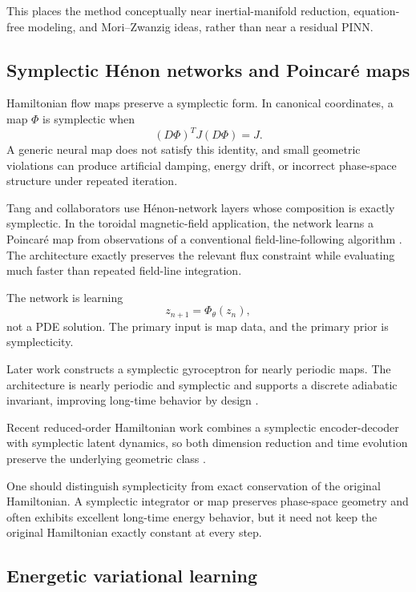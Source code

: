 \documentclass[11pt]{article}
\begin{document}
This places the method conceptually near inertial-manifold reduction, equation-free modeling, and Mori--Zwanzig ideas, rather than near a residual PINN.

\subsection{Symplectic H\'enon networks and Poincar\'e maps}

Hamiltonian flow maps preserve a symplectic form. In canonical coordinates, a map \(\Phi\) is symplectic when
\begin{equation}
 (D\Phi)^TJ(D\Phi)=J.
\end{equation}
A generic neural map does not satisfy this identity, and small geometric violations can produce artificial damping, energy drift, or incorrect phase-space structure under repeated iteration.

Tang and collaborators use H\'enon-network layers whose composition is exactly symplectic. In the toroidal magnetic-field application, the network learns a Poincar\'e map from observations of a conventional field-line-following algorithm \citep{burby2021poincare}. The architecture exactly preserves the relevant flux constraint while evaluating much faster than repeated field-line integration.

The network is learning
\[
 z_{n+1}=\Phi_\theta(z_n),
\]
not a PDE solution. The primary input is map data, and the primary prior is symplecticity.

Later work constructs a symplectic gyroceptron for nearly periodic maps. The architecture is nearly periodic and symplectic and supports a discrete adiabatic invariant, improving long-time behavior by design \citep{duruisseaux2022gyro}.

Recent reduced-order Hamiltonian work combines a symplectic encoder-decoder with symplectic latent dynamics, so both dimension reduction and time evolution preserve the underlying geometric class \citep{chen2025symplecticrom}.

One should distinguish symplecticity from exact conservation of the original Hamiltonian. A symplectic integrator or map preserves phase-space geometry and often exhibits excellent long-time energy behavior, but it need not keep the original Hamiltonian exactly constant at every step.

\subsection{Energetic variational learning}
\end{document}
